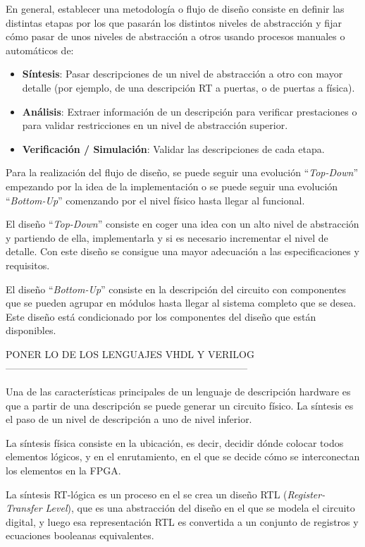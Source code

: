 En general, establecer una metodología o flujo de diseño consiste en definir las distintas etapas por los que pasarán los distintos niveles 
de abstracción y fijar cómo pasar de unos niveles de abstracción a otros usando procesos manuales o automáticos de:

\begin{itemize}
    \item \textbf{Síntesis}: Pasar descripciones de un nivel de abstracción a otro con mayor detalle (por ejemplo, de una descripción RT a 
    puertas, o de puertas a física).
    \item \textbf{Análisis}: Extraer información de un descripción para verificar prestaciones o para validar restricciones en un nivel 
    de abstracción superior.
    \item \textbf{Verificación / Simulación}: Validar las descripciones de cada etapa.
\end{itemize}

Para la realización del flujo de diseño, se puede seguir una evolución ``\textit{Top-Down}'' empezando por la idea de la implementación 
o se puede seguir una evolución ``\textit{Bottom-Up}'' comenzando por el nivel físico hasta llegar al funcional.

El diseño ``\textit{Top-Down}'' consiste en coger una idea con un alto nivel de abstracción y partiendo de ella, implementarla y si es necesario 
incrementar el nivel de detalle. Con este diseño se consigue una mayor adecuación a las especificaciones y requisitos.

El diseño ``\textit{Bottom-Up}'' consiste en la descripción del circuito con componentes que se pueden agrupar en módulos hasta llegar al 
sistema completo que se desea. Este diseño está condicionado por los componentes del diseño que están disponibles.

PONER LO DE LOS LENGUAJES VHDL Y VERILOG--------------------------------------------------------------------------

Una de las características principales de un lenguaje de descripción hardware es que a partir de una descripción se puede generar un 
circuito físico. La síntesis es el paso de un nivel de descripción a uno de nivel inferior.

La síntesis física consiste en la ubicación, es decir, decidir dónde colocar todos elementos lógicos, y en el enrutamiento, en el que se 
decide cómo se interconectan los elementos en la FPGA.

La síntesis RT-lógica es un proceso en el se crea un diseño RTL (\textit{Register-Transfer Level}), que es una abstracción del diseño 
en el que se modela el circuito digital, y luego esa representación RTL es convertida a un conjunto de registros y ecuaciones 
booleanas equivalentes. 


